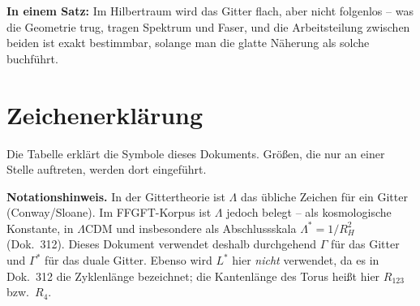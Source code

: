 \medskip
\noindent\textbf{In einem Satz:} Im Hilbertraum wird das Gitter
flach, aber nicht folgenlos -- was die Geometrie trug, tragen
Spektrum und Faser, und die Arbeitsteilung zwischen beiden ist
exakt bestimmbar, solange man die glatte Näherung als solche
buchführt.

\section*{Zeichenerklärung}

Die Tabelle erklärt die Symbole dieses Dokuments. Größen, die nur an
einer Stelle auftreten, werden dort eingeführt.

\textbf{Notationshinweis.} In der Gittertheorie ist $\Lambda$ das
übliche Zeichen für ein Gitter (Conway/Sloane). Im FFGFT-Korpus ist
$\Lambda$ jedoch belegt -- als kosmologische Konstante, in
$\Lambda$CDM und insbesondere als Abschlussskala $\Lambda^{*} =
1/R_H^2$ (Dok.~312). Dieses Dokument verwendet deshalb
durchgehend $\Gamma$ für das Gitter und $\Gamma^{*}$ für das duale
Gitter. Ebenso wird $L^{*}$ hier \emph{nicht} verwendet, da es in
Dok.~312 die Zyklenlänge bezeichnet; die Kantenlänge des Torus
heißt hier $R_{123}$ bzw.\ $R_4$.

